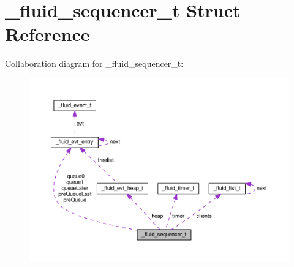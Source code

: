 \hypertarget{struct__fluid__sequencer__t}{}\section{\+\_\+fluid\+\_\+sequencer\+\_\+t Struct Reference}
\label{struct__fluid__sequencer__t}


Collaboration diagram for \+\_\+fluid\+\_\+sequencer\+\_\+t\+:
\nopagebreak
\begin{figure}[H]
\begin{center}
\leavevmode
\includegraphics[width=350pt]{struct__fluid__sequencer__t__coll__graph}
\end{center}
\end{figure}
